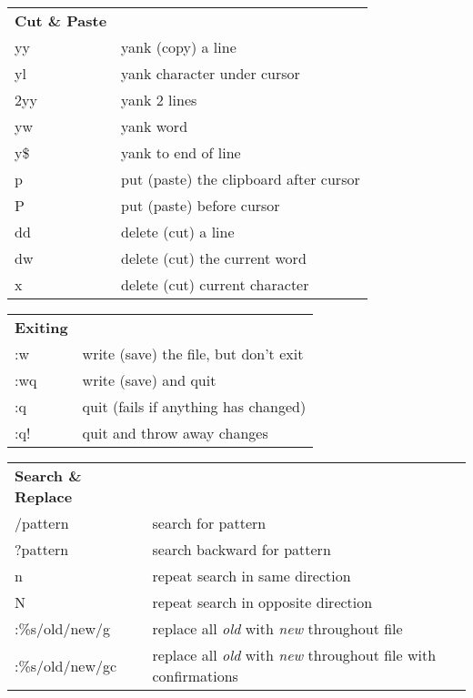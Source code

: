 \documentclass[11pt]{article}
\begin{document}
\bigskip\bigskip

\centering
{}
\begin{tabular}{| l | l |}
  \hline \hline
  \textbf{Cut \& Paste} & \\
  yy   & yank (copy) a line \\
  yl   & yank character under cursor \\
  2yy  & yank 2 lines \\
  yw   & yank word \\
  y\$  & yank to end of line \\
  p    & put (paste) the clipboard after cursor \\
  P    & put (paste) before cursor \\
  dd   & delete (cut) a line \\
  dw   & delete (cut) the current word \\
  x    & delete (cut) current character \\
  \hline \hline
\end{tabular}

\bigskip\bigskip

\centering
{}
\begin{tabular}{| l | l |}
  \hline \hline
  \textbf{Exiting} & \\
  :w   & write (save) the file, but don't exit \\
  :wq  & write (save) and quit \\
  :q   & quit (fails if anything has changed) \\
  :q!  & quit and throw away changes \\
  \hline \hline
\end{tabular}

\bigskip\bigskip

\centering
{}
\begin{tabular}{| l | l |}
  \hline \hline
  \textbf{Search \& Replace} & \\
  /pattern        & search for pattern \\
  ?pattern        & search backward for pattern \\
  n               & repeat search in same direction \\
  N               & repeat search in opposite direction \\
  :\%s/old/new/g  & replace all \emph{old} with \emph{new} throughout file \\
  :\%s/old/new/gc & replace all \emph{old} with \emph{new} throughout file with confirmations \\
  \hline \hline
\end{tabular}
\end{document}
